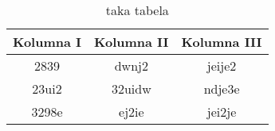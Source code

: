 \begin{table}[htbp]
\centering
\begin{tabular}{|c|c|c|}
\hline
\textbf{Kolumna I} & \textbf{Kolumna II} & \textbf{Kolumna III} \\ \hline
2839               & dwnj2               & jeije2               \\ \hline
23ui2              & 32uidw              & ndje3e               \\ \hline
3298e              & ej2ie               & jei2je               \\ \hline
\end{tabular}
\caption{taka tabela}
\label{tab:taka tabela}
\end{table}